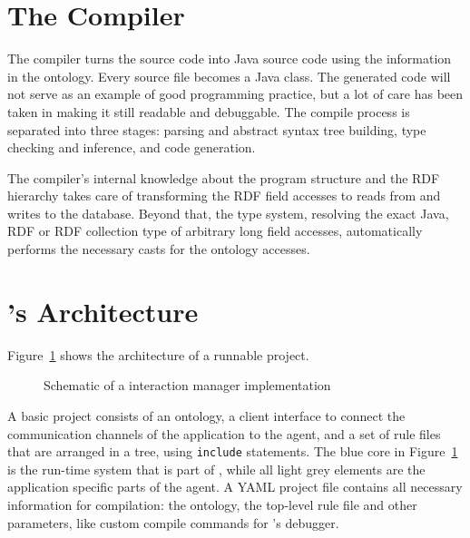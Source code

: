 \newcommand{\caret}{{\large\textbf{\textasciicircum}}}

\section{The \vonda Compiler}

The compiler turns the \vonda source code into Java source code using the
information in the ontology. Every source file becomes a Java class. The
generated code will not serve as an example of good programming practice, but a
lot of care has been taken in making it still readable and debuggable. The
compile process is separated into three stages: parsing and abstract syntax
tree building, type checking and inference, and code generation.

The \vonda compiler's internal knowledge about the program structure and the
RDF hierarchy takes care of transforming the RDF field accesses to reads from
and writes to the database. Beyond that, the type system, resolving the exact
Java, RDF or RDF collection type of arbitrary long field accesses,
automatically performs the necessary casts for the ontology accesses.

\section{\vonda's Architecture}

Figure~\ref{fig:architecture} shows the architecture of a runnable \vonda project.

\begin{figure}[htbp]
  \begin{center}
    \renewcommand{\sfdefault}{lmss}
    
  \end{center}
  \caption{Schematic of a \vonda interaction manager implementation}
  \label{fig:architecture}
\end{figure}

A basic \vonda project consists of an ontology, a client interface to
connect the communication channels of the application to the agent,
and a set of rule files that are arranged in a tree, using
\texttt{include} statements. The blue core in
Figure~\ref{fig:architecture} is the run-time system that is part of
\vonda, while all light grey elements are the application specific
parts of the agent. A YAML project file contains all
necessary information for compilation: the ontology, the top-level
rule file and other parameters, like custom compile commands for
\vonda's debugger.

